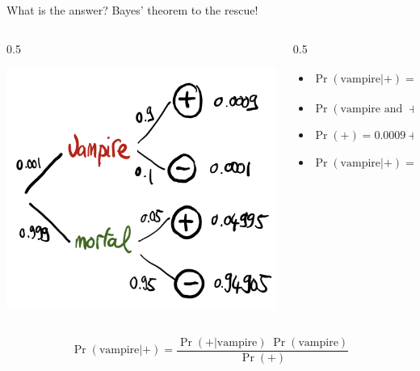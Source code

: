 \documentclass[
  ignorenonframetext,
  aspectratio=169]{beamer}
\providecommand{\tightlist}{%
  \setlength{\itemsep}{0pt}\setlength{\parskip}{0pt}}
\def\begincols{\begin{columns}[c]}
\def\endcols{\end{columns}}
\def\begincol{\begin{column}{0.5\textwidth}}
\def\endcol{\end{column}}
\begin{document}
\begin{frame}{What is the answer? Bayes' theorem to the rescue!}
\protect\hypertarget{what-is-the-answer-bayes-theorem-to-the-rescue}{}
\begincols
\begincol

\includegraphics{img/binary_covid.png}

\endcol

\begincol

\begin{itemize}
\tightlist
\item
  \(\Pr(\text{vampire}|+) = \displaystyle{\frac{\Pr(\text{vampire and } +)}{\Pr(+)}}\)
\end{itemize}

\pause

\begin{itemize}
\tightlist
\item
  \(\Pr(\text{vampire and } +) = \Pr(\text{vampire}) \; \Pr(+ | \text{vampire}) = 0.0009\)
\end{itemize}

\pause

\begin{itemize}
\tightlist
\item
  \(\Pr(+) = 0.0009 + 0.04995 = 0.05085\)
\end{itemize}

\pause

\begin{itemize}
\tightlist
\item
  \(\Pr(\text{vampire}|+) = 0.0009/0.05085 = 0.02\)
\end{itemize}

\endcol
\endcols

\pause

\[\Pr(\text{vampire}|+)= \displaystyle{\frac{ \Pr(+|\text{vampire}) \; \Pr(\text{vampire})}{\Pr(+)}}\]
\end{frame}
\end{document}
